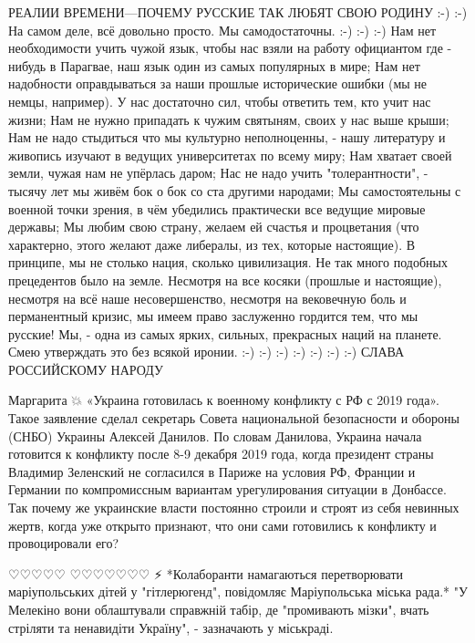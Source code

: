 РЕАЛИИ ВРЕМЕНИ---ПОЧЕМУ РУССКИЕ ТАК ЛЮБЯТ СВОЮ РОДИНУ :-) :-)
На самом деле, всё довольно просто. Мы самодостаточны. :-) :-) :-)
Нам нет необходимости учить чужой язык, чтобы нас взяли на работу официантом где - нибудь в Парагвае, наш язык один из самых популярных в мире;
Нам нет надобности оправдываться за наши прошлые исторические ошибки (мы не немцы, например). У нас достаточно сил, чтобы ответить тем, кто учит нас жизни;
Нам не нужно припадать к чужим святыням, своих у нас выше крыши;
Нам не надо стыдиться что мы культурно неполноценны, - нашу литературу и живопись изучают в ведущих университетах по всему миру;
Нам хватает своей земли, чужая нам не упёрлась даром;
Нас не надо учить "толерантности", - тысячу лет мы живём бок о бок со ста другими народами;
Мы самостоятельны с военной точки зрения, в чём убедились практически все ведущие мировые державы;
Мы любим свою страну, желаем ей счастья и процветания (что характерно, этого желают даже либералы, из тех, которые настоящие).
В принципе, мы не столько нация, сколько цивилизация.
Не так много подобных прецедентов было на земле. Несмотря на все косяки (прошлые и настоящие), несмотря на всё наше несовершенство, несмотря на вековечную боль и перманентный кризис, мы имеем право заслуженно гордится тем, что мы русские!
Мы, - одна из самых ярких, сильных, прекрасных наций на планете. Смею утверждать это без всякой иронии.
:-) :-) :-) :-) :-) :-) :-) СЛАВА РОССИЙСКОМУ НАРОДУ

Маргарита 💥
«Украина готовилась к военному конфликту с РФ с 2019 года».
Такое заявление сделал секретарь Совета национальной безопасности и обороны (СНБО) Украины Алексей Данилов.
По словам Данилова, Украина начала готовится к конфликту после 8-9 декабря 2019 года, когда президент страны Владимир Зеленский не согласился в Париже на условия РФ, Франции и Германии по компромиссным вариантам урегулирования ситуации в Донбассе.
Так почему же украинские власти постоянно строили и строят из себя невинных жертв, когда уже открыто признают, что они сами готовились к конфликту и провоцировали его?

♡♡♡♡♡ ♡♡♡♡♡♡♡
⚡️ *Колаборанти намагаються перетворювати маріупольських дітей у "гітлерюгенд", повідомляє Маріупольська міська рада.*
"У Мелекіно вони облаштували справжній табір, де "промивають мізки", вчать стріляти та ненавидіти Україну", - зазначають у міськраді.

